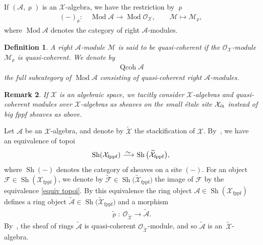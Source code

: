 \documentclass[pdftex]{sigma}%
\newtheorem{dfn}{Definition}[section]
\newtheorem{rem}[dfn]{Remark}
\numberwithin{equation}{section}
\newcommand{\Qcoh}{\operatorname{Qcoh}}
\newcommand{\Mod}{\operatorname{Mod}}
\newcommand{\fppf}{\operatorname{fppf}}
\newcommand{\Sh}{\operatorname{Sh}}
\newcommand{\et}{\text{\rm \'et}}
\newcommand{\cA}{\mathcal{A}}
\newcommand{\cF}{\mathcal{F}}
\newcommand{\cM}{\mathcal{M}}
\newcommand{\cO}{\mathcal{O}}
\newcommand{\cX}{\mathcal{X}}
\newcommand{\simto}{\,\,\,\,\raisebox{4pt}{$\sim$}{\kern -1.1em \longrightarrow}\,}
\begin{document}
 If $(\cA,\uprho)$ is an $\cX$-algebra, we have the restriction by $\uprho$
 \begin{gather*}
 (-)_{\uprho}\colon\quad \Mod\cA\to \Mod\cO_{\cX}, \qquad \cM\mapsto \cM_{\uprho},
 \end{gather*}
 where $ \Mod\cA$ denotes the category of right $\cA$-modules.
 \begin{dfn} A right $\cA$-module $\cM$ is said to be {\it quasi-coherent} if the $\cO_{\cX}$-module $\cM_{\uprho}$ is quasi-coherent. We denote by
 \begin{gather*}
 \Qcoh\cA
 \end{gather*}
 the full subcategory of $\Mod\cA$ consisting of quasi-coherent right $\cA$-modules.
 \end{dfn}

 \begin{rem}
 If $\cX$ is an algebraic space, we tacitly consider $\cX$-algebras and quasi-coherent modules over $\cX$-algebras as sheaves on the small \'etale site $\cX_{\et}$ instead of big fppf sheaves as above.
 \end{rem}



Let $\cA$ be an $\cX$-algebra, and denote by $\widetilde{\cX}$ the stackification of $\cX$. By~\cite[Lemma~12.1; 06WQ]{stacks}, we have an equivalence of topoi
\begin{equation}\label{equiv topoi}
\Sh(\cX_{\fppf})\simto \Sh\big(\widetilde{\cX}_{\fppf}\big),
\end{equation}
where $\Sh(-)$ denotes the category of sheaves on a site $(-)$. For an object $\cF\in \Sh(\cX_{\fppf})$, we denote by $\widetilde{\cF}\in\Sh\big(\widetilde{\cX}_{\fppf}\big)$ the image of $\cF$ by the equivalence \eqref{equiv topoi}.
By this equivalence the ring object $\cA\in\Sh(\cX_{\fppf})$ defines a ring object $\widetilde{\cA}\in\Sh\big(\widetilde{\cX}_{\fppf}\big)$ and a morphism
\begin{gather*}
\widetilde{\uprho}\colon\ \cO_{\widetilde{\cX}}\to \widetilde{\cA}.
\end{gather*}
By~\cite[Lemma~12.2; 06WR]{stacks}, the sheaf of rings $\widetilde{\cA}$ is quasi-coherent $\cO_{\widetilde{\cX}}$-module, and so $\widetilde{\cA}$ is an~$\widetilde{\cX}$-algebra.
\end{document}
